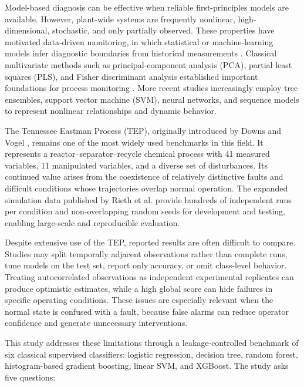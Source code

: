 \documentclass[10pt,twocolumn,a4paper]{article}
\begin{document}
Model-based diagnosis can be effective when reliable first-principles models
are available. However, plant-wide systems are frequently nonlinear,
high-dimensional, stochastic, and only partially observed. These properties
have motivated data-driven monitoring, in which statistical or machine-learning
models infer diagnostic boundaries from historical measurements
\cite{yin2014review, chiang2001book}. Classical multivariate methods such as
principal-component analysis (PCA), partial least squares (PLS), and Fisher
discriminant analysis established important foundations for process monitoring
\cite{chiang2000discriminant}. More recent studies increasingly employ tree
ensembles, support vector machine (SVM), neural networks, and sequence models to
represent nonlinear relationships and dynamic behavior.

The Tennessee Eastman Process (TEP), originally introduced by Downs and Vogel
\cite{downs1993tep}, remains one of the most widely used benchmarks in this
field. It represents a reactor--separator--recycle chemical process with 41
measured variables, 11 manipulated variables, and a diverse set of disturbances.
Its continued value arises from the coexistence of relatively distinctive
faults and difficult conditions whose trajectories overlap normal operation.
The expanded simulation data published by Rieth et al. \cite{rieth2017data}
provide hundreds of independent runs per condition and non-overlapping random
seeds for development and testing, enabling large-scale and reproducible
evaluation.

Despite extensive use of the TEP, reported results are often difficult to
compare. Studies may split temporally adjacent observations rather than complete
runs, tune models on the test set, report only accuracy, or omit class-level
behavior. Treating autocorrelated observations as independent experimental
replicates can produce optimistic estimates, while a high global score can hide
failures in specific operating conditions. These issues are especially relevant
when the normal state is confused with a fault, because false alarms can reduce
operator confidence and generate unnecessary interventions.

This study addresses these limitations through a leakage-controlled benchmark
of six classical supervised classifiers: logistic regression, decision tree,
random forest, histogram-based gradient boosting, linear SVM, and XGBoost. The study asks five questions:
\end{document}
